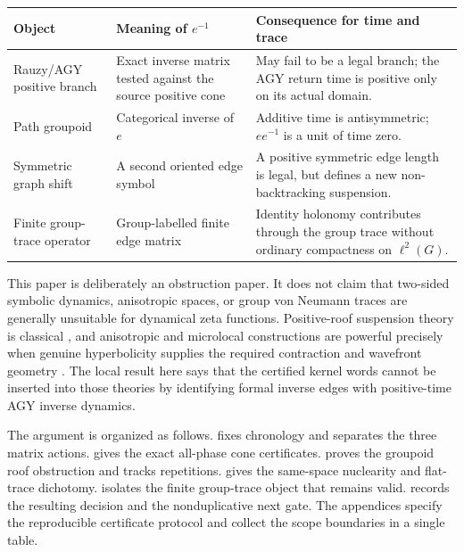 \begin{center}
\begin{tabularx}{0.96\textwidth}{@{}>{\raggedright\arraybackslash}p{}
  >{\raggedright\arraybackslash}p{}X@{}}
\toprule
Object & Meaning of $e^{-1}$ & Consequence for time and trace \\
\midrule
Rauzy/AGY positive branch & Exact inverse matrix tested against the source
positive cone & May fail to be a legal branch; the AGY return time is positive
only on its actual domain. \\
Path groupoid & Categorical inverse of $e$ & Additive time is antisymmetric;
$ee^{-1}$ is a unit of time zero. \\
Symmetric graph shift & A second oriented edge symbol & A positive symmetric
edge length is legal, but defines a new non-backtracking suspension. \\
Finite group-trace operator & Group-labelled finite edge matrix & Identity
holonomy contributes through the group trace without ordinary compactness on
$\ell^2(G)$. \\
\bottomrule
\end{tabularx}
\end{center}

This paper is deliberately an obstruction paper.  It does not claim that
two-sided symbolic dynamics, anisotropic spaces, or group von Neumann traces
are generally unsuitable for dynamical zeta functions.  Positive-roof
suspension theory is classical \citep{ParryPollicott1990}, and anisotropic and
microlocal constructions are powerful precisely when genuine hyperbolicity
supplies the required contraction and wavefront geometry
\citep{GouezelLiverani2006,GiuliettiLiveraniPollicott2013,
GiuliettiLiveraniPollicottErratum2022,DyatlovZworski2016}.  The local result
here says that the certified kernel words cannot be inserted into those
theories by identifying formal inverse edges with positive-time AGY inverse
dynamics.

The argument is organized as follows.   fixes chronology and
separates the three matrix actions.   gives the exact all-phase
cone certificates.   proves the groupoid roof obstruction and
tracks repetitions.   gives the same-space nuclearity and
flat-trace dichotomy.   isolates the finite group-trace
object that remains valid.   records the resulting
\RouteA{} decision and the nonduplicative next gate.  The appendices specify
the reproducible certificate protocol and collect the scope boundaries in a
single table.
